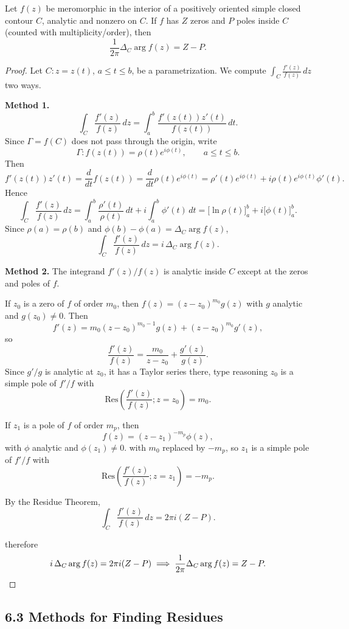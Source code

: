 \documentclass{article}
\begin{document}
\begin{theorem}
Let $f(z)$ be meromorphic in the interior of a positively oriented simple closed contour $C$, analytic and nonzero on $C$. If $f$ has $Z$ zeros and $P$ poles inside $C$ (counted with multiplicity/order), then
\[
\frac{1}{2\pi}\Delta_C \arg f(z) = Z-P.
\]
\end{theorem}

\begin{proof}
Let $C: z=z(t)$, $a\le t\le b$, be a parametrization. We compute $\displaystyle\int_C \frac{f'(z)}{f(z)}\,dz$ two ways.

\textbf{Method 1.}
\[
\int_C \frac{f'(z)}{f(z)}\,dz = \int_a^b \frac{f'(z(t))z'(t)}{f(z(t))}\,dt.
\]
Since $\Gamma = f(C)$ does not pass through the origin, write
\[
\Gamma: f(z(t)) = \rho(t)e^{i\phi(t)}, \qquad a\le t\le b. 
\]
Then
\[
f'(z(t))z'(t) = \frac{d}{dt}f(z(t)) = \frac{d}{dt}\rho(t)e^{i\phi(t)} = \rho'(t)e^{i\phi(t)} + i\rho(t)e^{i\phi(t)}\phi'(t). 
\]
Hence
\[
\int_C \frac{f'(z)}{f(z)}\,dz = \int_a^b \frac{\rho'(t)}{\rho(t)}\,dt + i\int_a^b \phi'(t)\,dt = \big[\ln\rho(t)\big]_a^b + i\big[\phi(t)\big]_a^b. 
\]
Since $\rho(a)=\rho(b)$ and $\phi(b)-\phi(a) = \Delta_C \arg f(z)$,
\[
\int_C \frac{f'(z)}{f(z)}\,dz = i\,\Delta_C \arg f(z). 
\]

\textbf{Method 2.}
The integrand $f'(z)/f(z)$ is analytic inside $C$ except at the zeros and poles of $f$.

If $z_0$ is a zero of $f$ of order $m_0$, then $f(z) = (z-z_0)^{m_0}g(z)$ with $g$ analytic and $g(z_0)\ne0$. 
Then
\[
f'(z) = m_0(z-z_0)^{m_0-1}g(z) + (z-z_0)^{m_0}g'(z),
\]
so
\[
\frac{f'(z)}{f(z)} = \frac{m_0}{z-z_0} + \frac{g'(z)}{g(z)}.
\]
Since $g'/g$ is analytic at $z_0$, it has a Taylor series there, type reasoning $z_0$ is a simple pole of $f'/f$ with
\[
\mathrm{Res}\left(\frac{f'(z)}{f(z)}; z=z_0\right) = m_0.
\]

If $z_1$ is a pole of $f$ of order $m_p$, then
\[
f(z) = (z-z_1)^{-m_p}\phi(z),
\]
with $\phi$ analytic and $\phi(z_1)\ne 0$.  with $m_0$ replaced by $-m_p$, so $z_1$ is a simple pole of $f'/f$ with
\[
\mathrm{Res}\left(\frac{f'(z)}{f(z)}; z=z_1\right) = -m_p.
\]

By the Residue Theorem,
\[
\int_C \frac{f'(z)}{f(z)}\,dz = 2\pi i(Z-P). 
\]

therefore 
\[
i\,\Delta_C \arg f(z) = 2\pi i(Z-P) \implies \frac{1}{2\pi}\Delta_C \arg f(z) = Z-P. \qedhere
\]
\end{proof}

\subsection*{6.3 Methods for Finding Residues}
\end{document}
